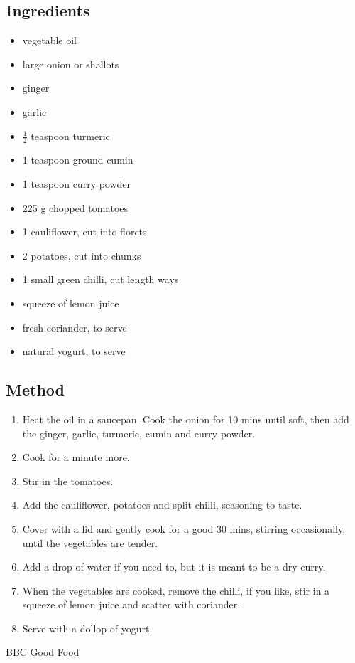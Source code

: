 \documentclass[11pt,a4paper]{article}
\begin{document}
\subsection*{Ingredients}

\begin{multicols}{2}

\begin{itemize}
  \item vegetable oil
  \item large onion or shallots
  \item ginger
  \item garlic
  \item $\frac {1} {2}$ teaspoon turmeric
  \item 1 teaspoon ground cumin
  \item 1 teaspoon curry powder
\end{itemize}

\columnbreak

\begin{itemize}
  \item 225 \si{\gram} chopped tomatoes
  \item 1 cauliflower, cut into florets
  \item 2 potatoes, cut into chunks
  \item 1 small green chilli, cut length ways
  \item squeeze of lemon juice
  \item fresh coriander, to serve
  \item natural yogurt, to serve
\end{itemize}

\end{multicols}

\medskip

\subsection*{Method}

\begin{enumerate}
  \item Heat the oil in a saucepan. Cook the onion for 10 mins until soft, then add the ginger, garlic, turmeric, cumin and curry powder.
  \item Cook for a minute more.
  \item Stir in the tomatoes.
  \item Add the cauliflower, potatoes and split chilli, seasoning to taste.
  \item Cover with a lid and gently cook for a good 30 mins, stirring occasionally, until the vegetables are tender.
  \item Add a drop of water if you need to, but it is meant to be a dry curry.
  \item When the vegetables are cooked, remove the chilli, if you like, stir in a squeeze of lemon juice and scatter with coriander.
  \item Serve with a dollop of yogurt.
\end{enumerate}

\href{https://www.bbcgoodfood.com/recipes/cauliflower-potato-curry}{BBC Good Food}
\end{document}
